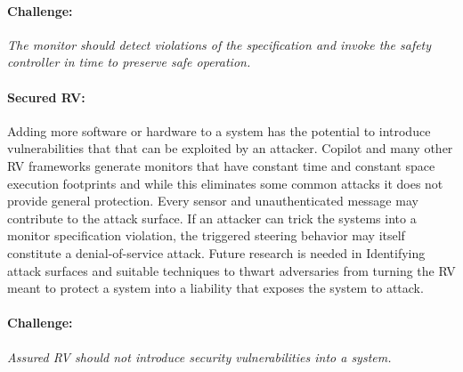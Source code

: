 \paragraph{Challenge:} \emph{The monitor should detect  violations of the specification and invoke the safety controller in time to preserve safe operation.}




\paragraph{Secured RV:} Adding more software or hardware to a system
has the potential to introduce vulnerabilities that that can be
exploited by an attacker.  Copilot and many other RV frameworks
generate monitors that have constant time and constant space execution
footprints and while this eliminates some common attacks it does not
provide general protection. Every sensor and unauthenticated message
may contribute to the attack surface. If an attacker can trick the
systems into a monitor specification violation, the triggered steering
behavior may itself constitute a denial-of-service attack.  Future
research is needed in Identifying attack surfaces and suitable
techniques to thwart adversaries from turning the RV meant to protect
a system into a liability that exposes the system to attack.

\paragraph{Challenge:} \emph{Assured RV should not introduce security
vulnerabilities into a system.} 



